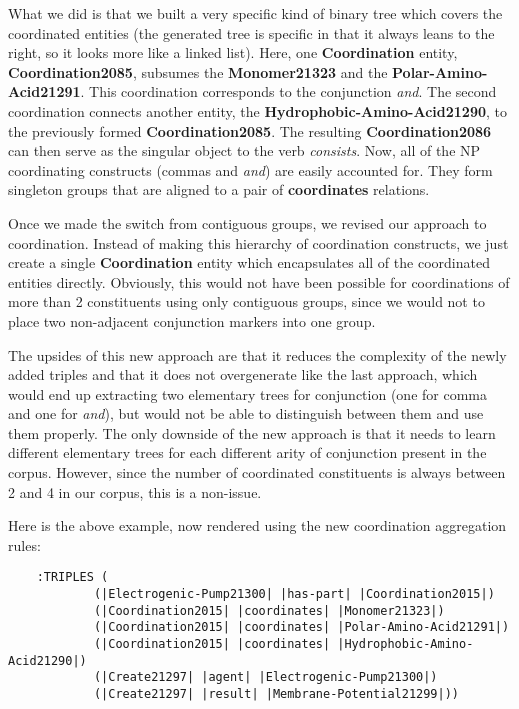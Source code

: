 \documentclass[a4paper]{article}
\begin{document}
What we did is that we built a very specific kind of binary tree which
covers the coordinated entities (the generated tree is specific in
that it always leans to the right, so it looks more like a linked
list). Here, one \textbf{Coordination} entity,
\textbf{Coordination2085}, subsumes the \textbf{Monomer21323} and the
\textbf{Polar-Amino-Acid21291}. This coordination corresponds to the
conjunction \emph{and}. The second coordination connects another
entity, the \textbf{Hydrophobic-Amino-Acid21290}, to the previously
formed \textbf{Coordination2085}. The resulting
\textbf{Coordination2086} can then serve as the singular object to the
verb \emph{consists}. Now, all of the NP coordinating constructs
(commas and \emph{and}) are easily accounted for. They form singleton
groups that are aligned to a pair of \textbf{coordinates} relations.

Once we made the switch from contiguous groups, we revised our
approach to coordination. Instead of making this hierarchy of
coordination constructs, we just create a single \textbf{Coordination}
entity which encapsulates all of the coordinated entities directly.
Obviously, this would not have been possible for coordinations of more
than 2 constituents using only contiguous groups, since we would not
to place two non-adjacent conjunction markers into one group.

The upsides of this new approach are that it reduces the complexity of
the newly added triples and that it does not overgenerate like the
last approach, which would end up extracting two elementary trees for
conjunction (one for comma and one for \emph{and}), but would not be
able to distinguish between them and use them properly. The only
downside of the new approach is that it needs to learn different
elementary trees for each different arity of conjunction present in
the corpus. However, since the number of coordinated constituents is
always between 2 and 4 in our corpus, this is a non-issue.

Here is the above example, now rendered using the new coordination
aggregation rules:

\begin{verbatim}
    :TRIPLES (
            (|Electrogenic-Pump21300| |has-part| |Coordination2015|)
            (|Coordination2015| |coordinates| |Monomer21323|)
            (|Coordination2015| |coordinates| |Polar-Amino-Acid21291|)
            (|Coordination2015| |coordinates| |Hydrophobic-Amino-Acid21290|)
            (|Create21297| |agent| |Electrogenic-Pump21300|)
            (|Create21297| |result| |Membrane-Potential21299|))
\end{verbatim}
\end{document}
